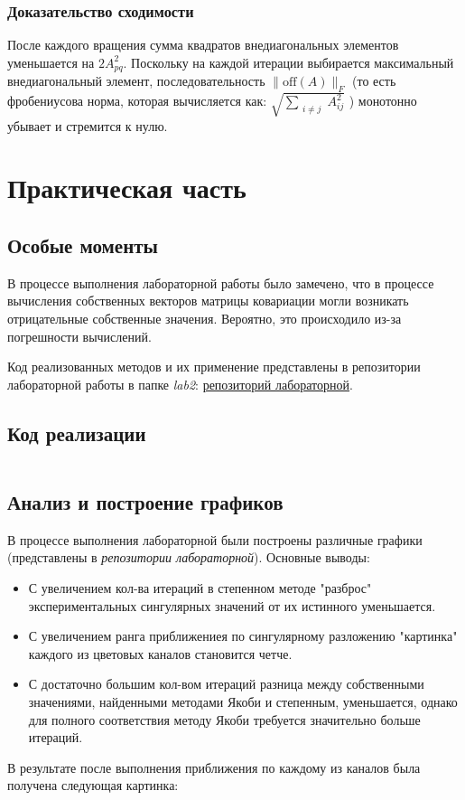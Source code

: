 \documentclass[a4paper, 12pt]{report}
\begin{document}
\subsection*{Доказательство сходимости}
После каждого вращения сумма квадратов внедиагональных элементов уменьшается на \( 2A_{pq}^2 \). Поскольку на каждой итерации выбирается максимальный внедиагональный элемент, последовательность \( \| \text{off}(A) \|_F \)  (то есть фробениусова норма, которая вычисляется как: \(\sqrt{
    \sum\limits_{\substack{i \neq j}} A_{ij}^2
}\) ) монотонно убывает и стремится к нулю.


\chapter*{Практическая часть}
\setcounter{chapter}{3}
\setcounter{section}{0}

\section{Особые моменты}
В процессе выполнения лабораторной работы было замечено, что в процессе вычисления собственных векторов
матрицы ковариации могли возникать отрицательные собственные значения. Вероятно, это происходило из-за 
погрешности вычислений. \par
Код реализованных методов и их применение представлены в репозитории лабораторной работы в папке \textit{lab2}: \textcolor{red}{\href{https://github.com/quant1on/chmas2/tree/master}{репозиторий лабораторной}}.

\section{Код реализации}
\inputminted[frame=single,fontsize=\small]{python3}{./utils.py}

\section{Анализ и построение графиков}
В процессе выполнения лабораторной были построены различные графики (представлены в \textit{репозитории лабораторной}). Основные выводы:
\begin{itemize}
    \item С увеличением кол-ва итераций в степенном методе "разброс" экспериментальных сингулярных значений
     от их истинного уменьшается.
    \item С увеличением ранга приближениея по сингулярному разложению "картинка" каждого из цветовых каналов становится четче.
    \item С достаточно большим кол-вом итераций разница между собственными значениями, найденными методами Якоби и степенным, уменьшается, однако для полного 
    соответствия методу Якоби требуется значительно больше итераций.
\end{itemize}
В результате после выполнения приближения по каждому из каналов была получена следующая картинка:
\end{document}
